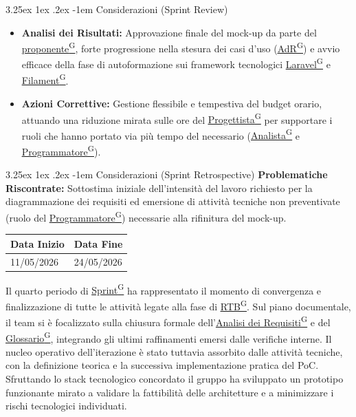 \documentclass[a4paper,12pt]{article}
\makeatletter
\newcounter{subsubsubsection}[subsubsection]
\renewcommand\paragraph{\@startsection{paragraph}{5}{\z@}%
  {3.25ex \@plus1ex \@minus.2ex}%
  {-1em}%
  {\normalfont\normalsize\bfseries}}
\providecommand{\glslink}[2]{\href{https://alittlebyte-19.github.io/Documentazione/glossario.html\#gls-#1}{\underline{#2}\textsuperscript{\scriptsize G}}}
\makeatother
\begin{document}
\paragraph{Considerazioni (Sprint Review)}
\begin{itemize}
    \item \textbf{Analisi dei Risultati:} Approvazione finale del mock-up da parte del \glslink{committente-proponente}{proponente}, forte progressione nella stesura dei casi d'uso (\glslink{analisi-dei-requisiti-adr}{AdR}) e avvio efficace della fase di autoformazione sui framework tecnologici \glslink{laravel}{Laravel} e \glslink{filament}{Filament}.
    \item \textbf{Azioni Correttive:} Gestione flessibile e tempestiva del budget orario, attuando una riduzione mirata sulle ore del \glslink{progettista}{Progettista} per supportare i ruoli che hanno portato via più tempo del necessario (\glslink{analista}{Analista} e \glslink{programmatore}{Programmatore}).
\end{itemize}

\paragraph{Considerazioni (Sprint Retrospective)}
\textbf{Problematiche Riscontrate:} Sottostima iniziale dell'intensità del lavoro richiesto per la diagrammazione dei requisiti ed emersione di attività tecniche non preventivate (ruolo del \glslink{programmatore}{Programmatore}) necessarie alla rifinitura del mock-up. 
\newpage


\label{sec:rtb_quartoperiodo}
\begin{table}[H]
    \centering
    \renewcommand{\arraystretch}{1.5} 
    \begin{tabularx}{\textwidth}{|X|X|}
    \hline \rowcolor{Dandelion!50}
    \textbf{Data Inizio} & \textbf{Data Fine}\\
    \hline
    11/05/2026 & 24/05/2026\\
    \hline

    \end{tabularx}
\end{table}

Il quarto periodo di \glslink{sprint}{Sprint} ha rappresentato il momento di convergenza e finalizzazione di tutte le attività legate alla fase di \glslink{rtb-requirements-and-technology-baseline}{RTB}. Sul piano documentale, il team si è focalizzato sulla chiusura formale dell'\glslink{analisi-dei-requisiti-adr}{Analisi dei Requisiti} e del \glslink{glossario}{Glossario}, integrando gli ultimi raffinamenti emersi dalle verifiche interne. Il nucleo operativo dell'iterazione è stato tuttavia assorbito dalle attività tecniche, con la definizione teorica e la successiva implementazione pratica del PoC. Sfruttando lo stack tecnologico concordato il gruppo ha sviluppato un prototipo funzionante mirato a validare la fattibilità delle architetture e a minimizzare i rischi tecnologici individuati. 
\end{document}
